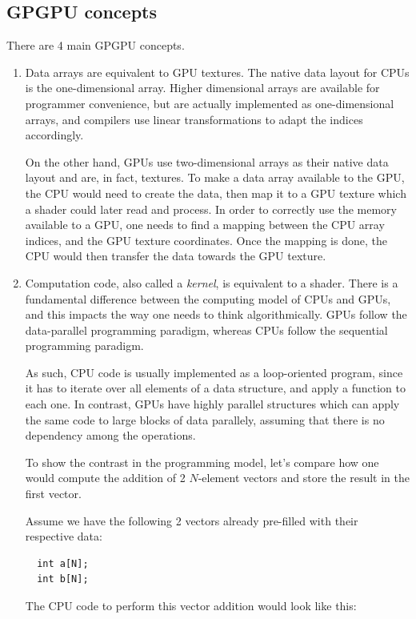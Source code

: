 \documentclass[10pt, a4paper]{report}
\begin{document}
\subsection{GPGPU concepts}
There are 4 main GPGPU concepts.

\begin{enumerate}
\item Data arrays are equivalent to GPU textures.
The native data layout for CPUs is the one-dimensional array.
Higher dimensional arrays are available for programmer convenience, but are
actually implemented as one-dimensional arrays, and compilers use linear
transformations to adapt the indices accordingly.

On the other hand, GPUs use two-dimensional arrays as their native data layout
and are, in fact, textures.
To make a data array available to the GPU, the CPU would need to create the
data, then map it to a GPU texture which a shader could later read and process.
In order to correctly use the memory available to a GPU, one needs to find a
mapping between the CPU array indices, and the GPU texture coordinates.
Once the mapping is done, the CPU would then transfer the data towards the GPU
texture.

\item Computation code, also called a \emph{kernel}, is equivalent to a shader.
There is a fundamental difference between the computing model of CPUs and GPUs,
and this impacts the way one needs to think algorithmically.
GPUs follow the data-parallel programming paradigm, whereas CPUs follow the
sequential programming paradigm.

As such, CPU code is usually implemented as a loop-oriented program, since it
has to iterate over all elements of a data structure, and apply a function to
each one.
In contrast, GPUs have highly parallel structures which can apply the same code
to large blocks of data parallely, assuming that there is no dependency among
the operations.

To show the contrast in the programming model, let's compare how one would
compute the addition of 2 $N$-element vectors and store the result in the first
vector.

Assume we have the following 2 vectors already pre-filled with their respective
data:

\begin{lstlisting}
  int a[N];
  int b[N];
\end{lstlisting}

The CPU code to perform this vector addition would look like this:


\end{enumerate}
\end{document}
